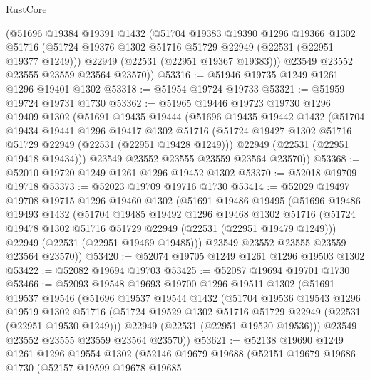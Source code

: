\begin{lexlean}{RustCore}
\begin{coremodule}
      (@51696
        @19384
        @19391
        @1432
        (@51704
          @19383
          @19390
          @1296
          @19366
          @1302
          @51716
          (@51724 @19376 @1302 @51716 @51729 @22949 (@22531 (@22951 @19377 @1249)))
          @22949
          (@22531 (@22951 @19367 @19383)))
        @23549
        @23552
        @23555
        @23559
        @23564
        @23570))
@53316 := @51946 @19735 @1249 @1261 @1296 @19401 @1302
@53318 := @51954 @19724 @19733
@53321 := @51959 @19724 @19731 @1730
@53362 := @51965
    @19446
    @19723
    @19730
    @1296
    @19409
    @1302
    (@51691
      @19435
      @19444
      (@51696
        @19435
        @19442
        @1432
        (@51704
          @19434
          @19441
          @1296
          @19417
          @1302
          @51716
          (@51724 @19427 @1302 @51716 @51729 @22949 (@22531 (@22951 @19428 @1249)))
          @22949
          (@22531 (@22951 @19418 @19434)))
        @23549
        @23552
        @23555
        @23559
        @23564
        @23570))
@53368 := @52010 @19720 @1249 @1261 @1296 @19452 @1302
@53370 := @52018 @19709 @19718
@53373 := @52023 @19709 @19716 @1730
@53414 := @52029
    @19497
    @19708
    @19715
    @1296
    @19460
    @1302
    (@51691
      @19486
      @19495
      (@51696
        @19486
        @19493
        @1432
        (@51704
          @19485
          @19492
          @1296
          @19468
          @1302
          @51716
          (@51724 @19478 @1302 @51716 @51729 @22949 (@22531 (@22951 @19479 @1249)))
          @22949
          (@22531 (@22951 @19469 @19485)))
        @23549
        @23552
        @23555
        @23559
        @23564
        @23570))
@53420 := @52074 @19705 @1249 @1261 @1296 @19503 @1302
@53422 := @52082 @19694 @19703
@53425 := @52087 @19694 @19701 @1730
@53466 := @52093
    @19548
    @19693
    @19700
    @1296
    @19511
    @1302
    (@51691
      @19537
      @19546
      (@51696
        @19537
        @19544
        @1432
        (@51704
          @19536
          @19543
          @1296
          @19519
          @1302
          @51716
          (@51724 @19529 @1302 @51716 @51729 @22949 (@22531 (@22951 @19530 @1249)))
          @22949
          (@22531 (@22951 @19520 @19536)))
        @23549
        @23552
        @23555
        @23559
        @23564
        @23570))
@53621 := @52138
    @19690
    @1249
    @1261
    @1296
    @19554
    @1302
    (@52146
      @19679
      @19688
      (@52151
        @19679
        @19686
        @1730
        (@52157
          @19599
          @19678
          @19685

\end{coremodule}
\end{lexlean}
